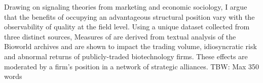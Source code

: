Drawing on signaling theories from marketing and economic sociology, I argue that the benefits of occupying an advantageous structural position vary with the observability of quality at the field level. Using a unique dataset collected from three distinct sources, Measures of  are derived from textual analysis of the Bioworld archives and are shown to impact the trading volume, idiosyncratic risk and abnormal returns of publicly-traded biotechnology firms. These effects are moderated by a firm's position in a network of strategic alliances.
TBW: Max 350 words